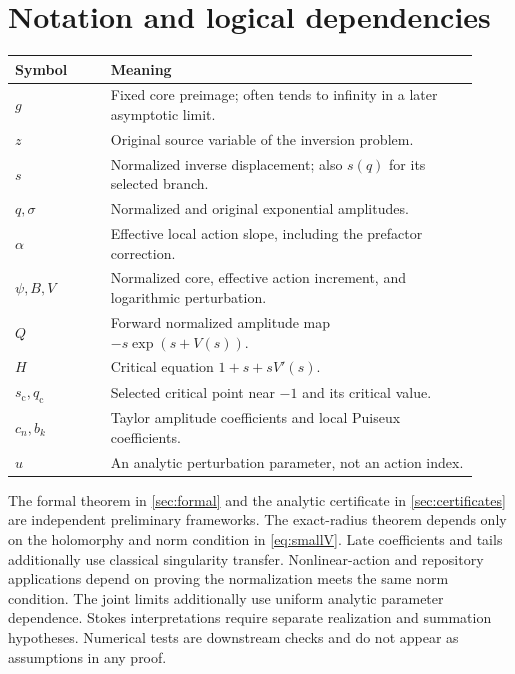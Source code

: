 \documentclass[11pt,a4paper]{article}
\numberwithin{equation}{section}
\theoremstyle{definition}
\theoremstyle{remark}
\newcommand{\scv}{s_{\mathrm c}}
\newcommand{\qcv}{q_{\mathrm c}}
\begin{document}
\appendix
\section{Notation and logical dependencies}
\label{app:notation}
\begin{center}\small
\begin{tabular}{>{\raggedright\arraybackslash}p{0.19\linewidth}p{0.73\linewidth}}
\toprule
Symbol & Meaning\\
\midrule
$g$ & Fixed core preimage; often tends to infinity in a later asymptotic limit.\\
$z$ & Original source variable of the inversion problem.\\
$s$ & Normalized inverse displacement; also $s(q)$ for its selected branch.\\
$q,\sigma$ & Normalized and original exponential amplitudes.\\
$\alpha$ & Effective local action slope, including the prefactor correction.\\
$\psi,B,V$ & Normalized core, effective action increment, and logarithmic perturbation.\\
$Q$ & Forward normalized amplitude map $-s\exp(s+V(s))$.\\
$H$ & Critical equation $1+s+sV'(s)$.\\
$\scv,\qcv$ & Selected critical point near $-1$ and its critical value.\\
$c_n,b_k$ & Taylor amplitude coefficients and local Puiseux coefficients.\\
$u$ & An analytic perturbation parameter, not an action index.\\
\bottomrule
\end{tabular}
\end{center}

The formal theorem in \cref{sec:formal} and the analytic certificate in \cref{sec:certificates} are independent preliminary frameworks. The exact-radius theorem depends only on the holomorphy and norm condition in \eqref{eq:smallV}. Late coefficients and tails additionally use classical singularity transfer. Nonlinear-action and repository applications depend on proving the normalization meets the same norm condition. The joint limits additionally use uniform analytic parameter dependence. Stokes interpretations require separate realization and summation hypotheses. Numerical tests are downstream checks and do not appear as assumptions in any proof.
\end{document}
